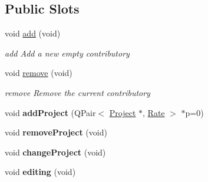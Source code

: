 \subsection*{Public Slots}
\begin{DoxyCompactItemize}
\item 
\hypertarget{classGui_1_1Widgets_1_1ContributoriesWidget_a756c0d1076fad1a3805975343e66a1de}{void \hyperlink{classGui_1_1Widgets_1_1ContributoriesWidget_a756c0d1076fad1a3805975343e66a1de}{add} (void)}\label{classGui_1_1Widgets_1_1ContributoriesWidget_a756c0d1076fad1a3805975343e66a1de}

\begin{DoxyCompactList}\small\item\em add Add a new empty contributory \end{DoxyCompactList}\item 
\hypertarget{classGui_1_1Widgets_1_1ContributoriesWidget_a35895ad0b9c497263f633680288b414e}{void \hyperlink{classGui_1_1Widgets_1_1ContributoriesWidget_a35895ad0b9c497263f633680288b414e}{remove} (void)}\label{classGui_1_1Widgets_1_1ContributoriesWidget_a35895ad0b9c497263f633680288b414e}

\begin{DoxyCompactList}\small\item\em remove Remove the current contributory \end{DoxyCompactList}\item 
\hypertarget{classGui_1_1Widgets_1_1ContributoriesWidget_afaa982bf1f4b77fd3bf55be0c83c4056}{void {\bfseries add\-Project} (Q\-Pair$<$ \hyperlink{classModels_1_1Project}{Project} $\ast$, \hyperlink{classModels_1_1Rate}{Rate} $>$ $\ast$p=0)}\label{classGui_1_1Widgets_1_1ContributoriesWidget_afaa982bf1f4b77fd3bf55be0c83c4056}

\item 
\hypertarget{classGui_1_1Widgets_1_1ContributoriesWidget_ad907c5827c4e1ee3b82adbe6f2f77309}{void {\bfseries remove\-Project} (void)}\label{classGui_1_1Widgets_1_1ContributoriesWidget_ad907c5827c4e1ee3b82adbe6f2f77309}

\item 
\hypertarget{classGui_1_1Widgets_1_1ContributoriesWidget_a5a4be90c82f8b6d0b0e3b7a658a488ee}{void {\bfseries change\-Project} (void)}\label{classGui_1_1Widgets_1_1ContributoriesWidget_a5a4be90c82f8b6d0b0e3b7a658a488ee}

\item 
\hypertarget{classGui_1_1Widgets_1_1ContributoriesWidget_acb1cc99ae6f72205394d7b52f0a5f20d}{void {\bfseries editing} (void)}\label{classGui_1_1Widgets_1_1ContributoriesWidget_acb1cc99ae6f72205394d7b52f0a5f20d}


\end{DoxyCompactItemize}
